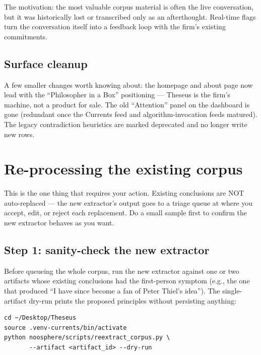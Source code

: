 \documentclass[11pt]{article}
\begin{document}
The motivation: the most valuable corpus material is often the
live conversation, but it was historically lost or transcribed
only as an afterthought. Real-time flags turn the conversation
itself into a feedback loop with the firm's existing commitments.

\subsection{Surface cleanup}

A few smaller changes worth knowing about: the homepage and
about page now lead with the ``Philosopher in a Box'' positioning
— Theseus is the firm's machine, not a product for sale. The old
``Attention'' panel on the dashboard is gone (redundant once the
Currents feed and algorithm-invocation feeds matured). The legacy
contradiction heuristics are marked deprecated and no longer write
new rows.

\section{Re-processing the existing corpus}
\label{sec:reprocessing}

\begin{tldr}
This is the one thing that requires your action. Existing
conclusions are NOT auto-replaced — the new extractor's output
goes to a triage queue at 
where you accept, edit, or reject each replacement. Do a small
sample first to confirm the new extractor behaves as you want.
\end{tldr}

\subsection{Step 1: sanity-check the new extractor}

Before queueing the whole corpus, run the new extractor against
one or two artifacts whose existing conclusions had the
first-person symptom (e.g., the one that produced ``I have since
become a fan of Peter Thiel's idea''). The single-artifact dry-run
prints the proposed principles without persisting anything:

\begin{verbatim}
cd ~/Desktop/Theseus
source .venv-currents/bin/activate
python noosphere/scripts/reextract_corpus.py \
       --artifact <artifact_id> --dry-run
\end{verbatim}
\end{document}
